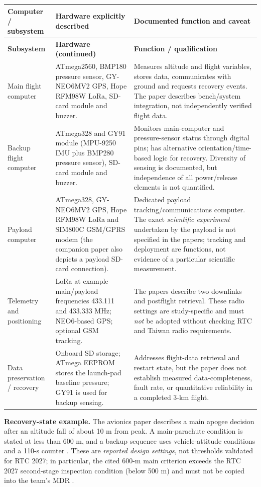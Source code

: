 \documentclass[10pt,a4paper]{article}
\begin{document}
\small
\begin{longtable}{@{}L{29mm}L{62mm}L{52mm}@{}}
\toprule{}\textbf{Computer / subsystem} & \textbf{Hardware explicitly described} & \textbf{Documented function and caveat}\\\midrule\endfirsthead
\toprule{}\textbf{Subsystem} & \textbf{Hardware (continued)} & \textbf{Function / qualification}\\\midrule\endhead
\bottomrule\endlastfoot
Main flight computer & ATmega2560, BMP180 pressure sensor, GY-NEO6MV2 GPS, Hope RFM98W LoRa, SD-card module and buzzer. & Measures altitude and flight variables, stores data, communicates with ground and requests recovery events. The paper describes bench/system integration, not independently verified flight data.\\
Backup flight computer & ATmega328 and GY91 module (MPU-9250 IMU plus BMP280 pressure sensor), SD-card module and buzzer. & Monitors main-computer and pressure-sensor status through digital pins; has alternative orientation/time-based logic for recovery. Diversity of sensing is documented, but independence of all power/release elements is not quantified.\\
Payload computer & ATmega328, GY-NEO6MV2 GPS, Hope RFM98W LoRa and SIM800C GSM/GPRS modem (the companion paper also depicts a payload SD-card connection). & Dedicated payload tracking/communications computer. The exact \emph{scientific experiment} undertaken by the payload is not specified in the papers; tracking and deployment are functions, not evidence of a particular scientific measurement.\\
Telemetry and positioning & LoRa at example main/payload frequencies 433.111 and 433.333 MHz; NEO6-based GPS; optional GSM tracking. & The papers describe two downlinks and postflight retrieval. These radio settings are study-specific and must \emph{not} be adopted without checking RTC and Taiwan radio requirements.\\
Data preservation / recovery & Onboard SD storage; ATmega EEPROM stores the launch-pad baseline pressure; GY91 is used for backup sensing. & Addresses flight-data retrieval and restart state, but the paper does not establish measured data-completeness, fault rate, or quantitative reliability in a completed 3-km flight.\\
\end{longtable}
\normalsize

\textbf{Recovery-state example.} The avionics paper describes a main apogee decision after an altitude fall of about 10 m from peak. A main-parachute condition is stated at less than 600 m, and a backup sequence uses vehicle-attitude conditions and a 110-s counter \cite{bakirci2022}. These are \emph{reported design settings}, not thresholds validated for RTC 2027; in particular, the cited 600-m main criterion exceeds the RTC 2027 second-stage inspection condition (below 500 m) and must not be copied into the team's MDR \cite{rtc2027rules}.
\end{document}
